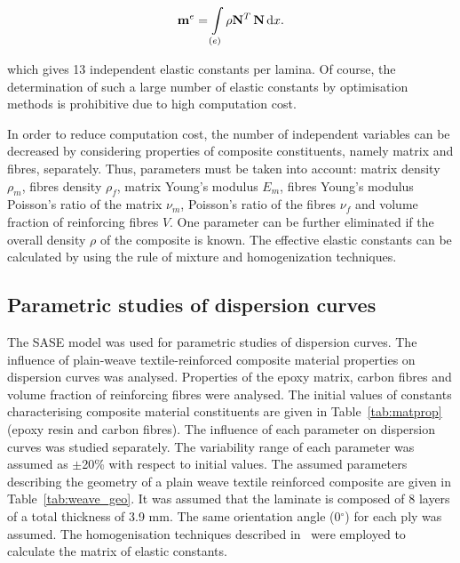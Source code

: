 \begin{equation}
	 \mathbf{m}^e= \int \limits_{(e)}\rho \mathbf{N}^{T} \, \mathbf{N}\, \mathrm{d} x .
 	\end{equation}

 which gives 13 independent elastic constants per lamina. Of course, the determination of such a large number of elastic constants by optimisation methods is prohibitive due to high computation cost. 
 
 In order to reduce computation cost, the number of independent variables can be 
 decreased by considering properties of composite constituents, namely matrix and 
 fibres, separately. Thus,     parameters must be taken into account: matrix density 
 \(\rho_m\), fibres density \(\rho_f\), matrix Young's modulus \(E_m\), fibres Young's 
 modulus   
 Poisson's ratio of the matrix \(\nu_m\), Poisson's ratio of the fibres \(\nu_f\) and volume 
 fraction of reinforcing fibres \(V\). One parameter can be further eliminated if the 
 overall 
 density \(\rho\) of the composite is known.  The effective elastic constants can be calculated by using the rule of 
 mixture and homogenization techniques.
 
 
\subsection{Parametric studies of dispersion curves \label{sec:parametric}}
 
 The SASE model was used for parametric studies of dispersion curves. The influence 
 of plain-weave textile-reinforced composite material properties on dispersion curves 
 was analysed. Properties of the epoxy matrix, carbon fibres and volume fraction of 
 reinforcing fibres were analysed. The initial values of constants characterising 
 composite material constituents are given in Table~\ref{tab:matprop} (epoxy resin and 
 carbon fibres). The influence of each parameter on dispersion curves was studied 
 separately. The variability range of each parameter was assumed as \(\pm\)20\% with 
 respect to initial values. The assumed parameters describing the geometry of a plain 
 weave textile reinforced composite are given in Table~\ref{tab:weave_geo}. It was 
 assumed that the laminate is composed of 8 layers of a total thickness of 3.9 mm. The 
 same orientation angle (0\(^{\circ}\)) for each ply was assumed. The homogenisation 
 techniques described in~\cite{Barbero2006,Adumitroaie2012} were employed to 
 calculate the matrix of elastic constants.
 
